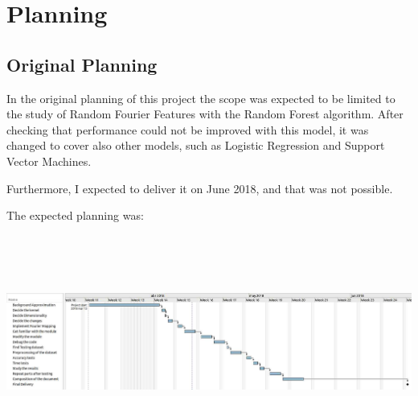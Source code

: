 \documentclass{article}
\begin{document}
%
%

\section{Planning}
    \subsection{Original Planning}

    In the original planning of this project the scope was
    expected to be limited to the study of Random Fourier Features with the
    Random Forest algorithm. After checking that
    performance could not be improved with this model,
    it was changed to cover also other models, such as Logistic
    Regression and Support Vector Machines.

    Furthermore, I expected to deliver it on June 2018, and that was not
    possible.

    The expected planning was:

    \hspace*{-3cm}
    \includegraphics[width=17cm, height=7cm]{planning.jpg}
\end{document}
